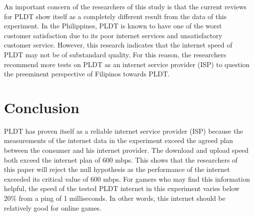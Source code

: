 \documentclass[conference]{IEEEtran}
\begin{document}
An important concern of the researchers of this study is that the current reviews for PLDT show itself as a completely different result from the data of this experiment. In the Philippines, PLDT is known to have one of the worst customer satisfaction due to its poor internet services and unsatisfactory customer service. However, this research indicates that the internet speed of PLDT may not be of substandard quality. For this reason, the researchers recommend more tests on PLDT as an internet service provider (ISP) to question the preeminent perspective of Filipinos towards PLDT.


\section{Conclusion}
PLDT has proven itself as a reliable internet service provider (ISP) because the measurements of the internet data in the experiment exceed the agreed plan between the consumer and his internet provider.
The download and upload speed both exceed the internet plan of 600 mbps. This shows that the researchers of this paper will reject the null hypothesis as the performance of the internet exceeded its critical value of 600 mbps. For gamers who may find this information helpful, the speed of the tested PLDT internet in this experiment varies below 20\% from a ping of 1 milliseconds.
In other words, this internet should be relatively good for online games.
\end{document}
